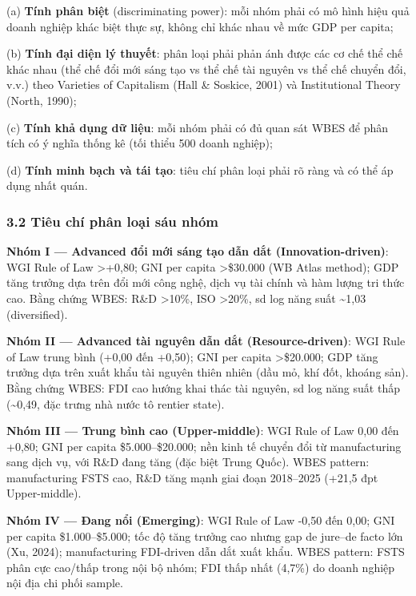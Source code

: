 \documentclass[12pt,a4paper]{article}
\begin{document}
(a) \textbf{Tính phân biệt} (discriminating power): mỗi nhóm phải có mô
hình hiệu quả doanh nghiệp khác biệt thực sự, không chỉ khác nhau về mức
GDP per capita;

(b) \textbf{Tính đại diện lý thuyết}: phân loại phải phản ánh được các
cơ chế thể chế khác nhau (thể chế đổi mới sáng tạo vs thể chế tài nguyên
vs thể chế chuyển đổi, v.v.) theo Varieties of Capitalism (Hall \&
Soskice, 2001) và Institutional Theory (North, 1990);

(c) \textbf{Tính khả dụng dữ liệu}: mỗi nhóm phải có đủ quan sát WBES để
phân tích có ý nghĩa thống kê (tối thiểu 500 doanh nghiệp);

(d) \textbf{Tính minh bạch và tái tạo}: tiêu chí phân loại phải rõ ràng
và có thể áp dụng nhất quán.

\hypertarget{32-tiuxeau-chuxed-phuxe2n-loux1ea1i-suxe1u-nhuxf3m}{%
\subsubsection{3.2 Tiêu chí phân loại sáu
nhóm}\label{32-tiuxeau-chuxed-phuxe2n-loux1ea1i-suxe1u-nhuxf3m}}

\textbf{Nhóm I --- Advanced đổi mới sáng tạo dẫn dắt
(Innovation-driven)}: WGI Rule of Law \textgreater+0,80; GNI per capita
\textgreater\$30.000 (WB Atlas method); GDP tăng trưởng dựa trên đổi mới
công nghệ, dịch vụ tài chính và hàm lượng tri thức cao. Bằng chứng WBES:
R\&D \textgreater10\%, ISO \textgreater20\%, sd log năng suất
\textasciitilde1,03 (diversified).

\textbf{Nhóm II --- Advanced tài nguyên dẫn dắt (Resource-driven)}: WGI
Rule of Law trung bình (+0,00 đến +0,50); GNI per capita
\textgreater\$20.000; GDP tăng trưởng dựa trên xuất khẩu tài nguyên
thiên nhiên (dầu mỏ, khí đốt, khoáng sản). Bằng chứng WBES: FDI cao
hướng khai thác tài nguyên, sd log năng suất thấp (\textasciitilde0,49,
đặc trưng nhà nước tô rentier state).

\textbf{Nhóm III --- Trung bình cao (Upper-middle)}: WGI Rule of Law
0,00 đến +0,80; GNI per capita \$5.000--\$20.000; nền kinh tế chuyển đổi
từ manufacturing sang dịch vụ, với R\&D đang tăng (đặc biệt Trung Quốc).
WBES pattern: manufacturing FSTS cao, R\&D tăng mạnh giai đoạn
2018--2025 (+21,5 đpt Upper-middle).

\textbf{Nhóm IV --- Đang nổi (Emerging)}: WGI Rule of Law -0,50 đến
0,00; GNI per capita \$1.000--\$5.000; tốc độ tăng trưởng cao nhưng gap
de jure--de facto lớn (Xu, 2024); manufacturing FDI-driven dẫn dắt xuất
khẩu. WBES pattern: FSTS phân cực cao/thấp trong nội bộ nhóm; FDI thấp
nhất (4,7\%) do doanh nghiệp nội địa chi phối sample.
\end{document}
